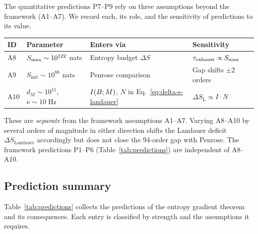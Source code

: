 The quantitative predictions P7--P9 rely on three assumptions beyond
the framework (A1--A7).  We record each, its role, and the sensitivity
of predictions to its value.

\begin{center}
\begin{tabular}{@{}llll@{}}
  \toprule
  ID & Parameter & Enters via & Sensitivity \\
  \midrule
  A8 & $S_{\max}\sim 10^{122}$ nats
     & Entropy budget $\Delta S$
     & $\tau_{\mathrm{exhaust}} \propto S_{\max}$ \\
  A9 & $S_{\mathrm{init}}\sim 10^{88}$ nats
     & Penrose comparison
     & Gap shifts $\pm 2$ orders \\
  A10 & $d_M\!\sim\! 10^{11}$, $\nu\!\sim\! 10\;\text{Hz}$
      & $I(B;M)$, $N$ in Eq.~\eqref{eq:delta-s-landauer}
      & $\Delta S_{\mathrm{L}}\!\propto\! I\!\cdot\! N$ \\
  \bottomrule
\end{tabular}
\end{center}

\noindent
These are \emph{separate} from the framework assumptions A1--A7.
Varying A8--A10 by several orders of magnitude in either direction
shifts the Landauer deficit $\Delta S_{\mathrm{Landauer}}$
accordingly but does not close the 94-order gap with Penrose.  The
framework predictions P1--P6 (Table~\ref{tab:predictions}) are
independent of A8--A10.

\subsection{Prediction summary}\label{sec:pred-table}

Table~\ref{tab:predictions} collects the predictions of the
entropy gradient theorem and its consequences.  Each entry is
classified by strength and the assumptions it requires.

